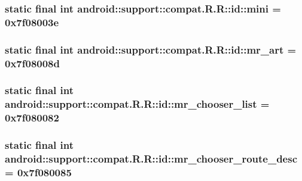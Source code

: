 \hypertarget{classandroid_1_1support_1_1compat_1_1_r_1_1id_86b7fd50602e8578bfc8eb816fa02489}{
\subsubsection[{mini}]{\setlength{\rightskip}{0pt plus 5cm}static final int android::support::compat.R.R::id::mini = 0x7f08003e}}
\label{classandroid_1_1support_1_1compat_1_1_r_1_1id_86b7fd50602e8578bfc8eb816fa02489}


\hypertarget{classandroid_1_1support_1_1compat_1_1_r_1_1id_a5811b94bba57f340cc4f8b494af88e3}{
\subsubsection[{mr\_\-art}]{\setlength{\rightskip}{0pt plus 5cm}static final int android::support::compat.R.R::id::mr\_\-art = 0x7f08008d}}
\label{classandroid_1_1support_1_1compat_1_1_r_1_1id_a5811b94bba57f340cc4f8b494af88e3}


\hypertarget{classandroid_1_1support_1_1compat_1_1_r_1_1id_0bf63816266615c179aa7a30a444b0d2}{
\subsubsection[{mr\_\-chooser\_\-list}]{\setlength{\rightskip}{0pt plus 5cm}static final int android::support::compat.R.R::id::mr\_\-chooser\_\-list = 0x7f080082}}
\label{classandroid_1_1support_1_1compat_1_1_r_1_1id_0bf63816266615c179aa7a30a444b0d2}


\hypertarget{classandroid_1_1support_1_1compat_1_1_r_1_1id_e1fee2bc4c0bb8ebf9b35c42909c55e7}{
\subsubsection[{mr\_\-chooser\_\-route\_\-desc}]{\setlength{\rightskip}{0pt plus 5cm}static final int android::support::compat.R.R::id::mr\_\-chooser\_\-route\_\-desc = 0x7f080085}}
\label{classandroid_1_1support_1_1compat_1_1_r_1_1id_e1fee2bc4c0bb8ebf9b35c42909c55e7}


